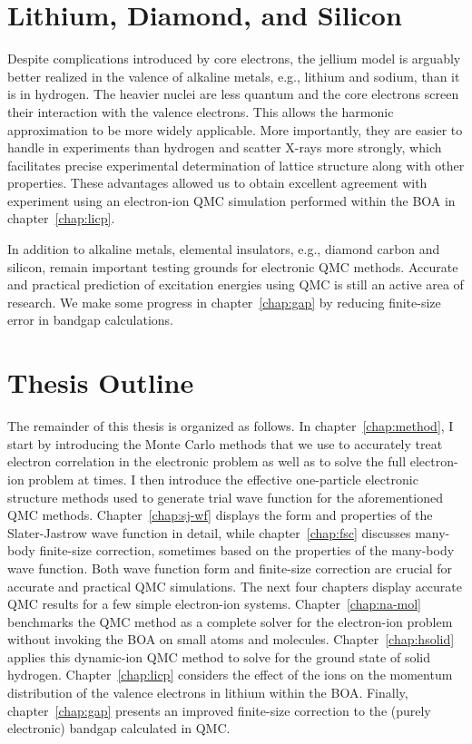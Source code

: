 
\section{Lithium, Diamond, and Silicon}
Despite complications introduced by core electrons, the jellium model is arguably better realized in the valence of alkaline metals, e.g., lithium and sodium, than it is in hydrogen.
The heavier nuclei are less quantum and the core electrons screen their interaction with the valence electrons.
This allows the harmonic approximation to be more widely applicable.
More importantly, they are easier to handle in experiments than hydrogen and scatter X-rays more strongly, which facilitates precise experimental determination of lattice structure along with other properties.
These advantages allowed us to obtain excellent agreement with experiment using an electron-ion QMC simulation performed within the BOA in chapter~\ref{chap:licp}.

In addition to alkaline metals, elemental insulators, e.g., diamond carbon and silicon, remain important testing grounds for electronic QMC methods. Accurate and practical prediction of excitation energies using QMC is still an active area of research. We make some progress in chapter~\ref{chap:gap} by reducing finite-size error in bandgap calculations.

\section{Thesis Outline}
The remainder of this thesis is organized as follows. In chapter~\ref{chap:method}, I start by introducing the Monte Carlo methods that we use to accurately treat electron correlation in the electronic problem as well as to solve the full electron-ion problem at times. I then introduce the effective one-particle electronic structure methods used to generate trial wave function for the aforementioned QMC methods.
Chapter~\ref{chap:sj-wf} displays the form and properties of the Slater-Jastrow wave function in detail, while chapter~\ref{chap:fsc} discusses many-body finite-size correction, sometimes based on the properties of the many-body wave function.
Both wave function form and finite-size correction are crucial for accurate and practical QMC simulations.
The next four chapters display accurate QMC results for a few simple electron-ion systems.
Chapter~\ref{chap:na-mol} benchmarks the QMC method as a complete solver for the electron-ion problem without invoking the BOA on small atoms and molecules.
Chapter~\ref{chap:hsolid} applies this dynamic-ion QMC method to solve for the ground state of solid hydrogen.
Chapter~\ref{chap:licp} considers the effect of the ions on the momentum distribution of the valence electrons in lithium within the BOA.
Finally, chapter~\ref{chap:gap} presents an improved finite-size correction to the (purely electronic) bandgap calculated in QMC.